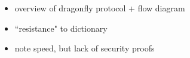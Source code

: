 
\begin{itemize}
    \item overview of dragonfly protocol + flow diagram
    \item ``resistance" to dictionary
    \item note speed, but lack of security proofs
\end{itemize}
